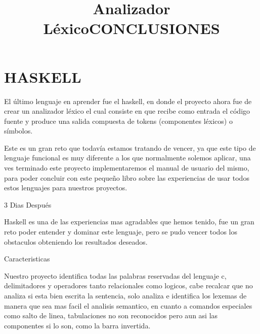 \documentclass[12pt]{extbook}
\begin{document}
\chapter{HASKELL}
\begin{center}
\title{\Large{Analizador Léxico}}\maketitle
\end{center}
El último lenguaje en aprender fue el haskell, en donde el proyecto ahora fue de crear un analizador léxico el cual consiste en que recibe como entrada el código fuente  y produce una salida compuesta de tokens (componentes léxicos) o símbolos.




\begin{center}
\title{CONCLUSIONES}\maketitle
\end{center}

Este es un gran reto que todavía estamos tratando de vencer, ya que
este tipo de lenguaje funcional es muy diferente a los que normalmente
solemos aplicar, una ves terminado este proyecto implementaremos el
manual de usuario del mismo, para poder concluir con este pequeño
libro sobre las experiencias de usar todos estos lenguajes para nuestros
proyectos.\\
\begin{center}
{\Large{3 Dias Después}}\\
\end{center}
Haskell es una de las experiencias mas agradables que hemos tenido, fue un 
gran reto poder entender y dominar este lenguaje, pero se pudo vencer
todos los obstaculos obteniendo los resultados deseados.\\
\begin{center}
{\Large{Caracteristicas}}\\
\end{center}
Nuestro proyecto identifica todas las palabras reservadas del lenguaje c, delimitadores y operadores tanto relacionales como
logicos, cabe recalcar que no analiza si esta bien escrita la sentencia, solo analiza e identifica los lexemas de manera que sea mas
facil el analisis semantico, en cuanto a comandos especiales como salto de linea, tabulaciones no son reconocidos pero aun asi las
componentes si lo son, como la barra invertida.
\end{document}

